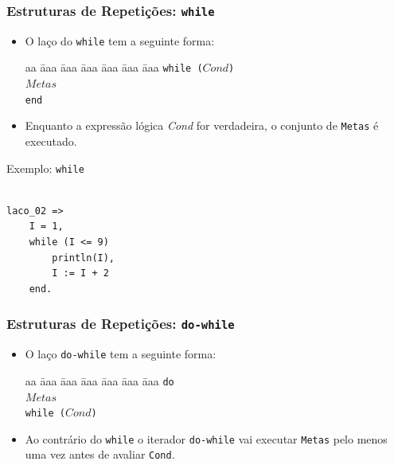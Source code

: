 \begin{frame}[fragile]
\frametitle{Estruturas de Repetições: \texttt{while}}


\begin{itemize}
        \item O laço do \texttt{while} tem a seguinte forma:
        
        \begin{tabbing}
            aa \= aaa \= aaa \= aaa \= aaa \= aaa \= aaa \kill
            \> \texttt{while ($Cond$)} \\
            \> \> $Metas$  \\
            \>  \texttt{end}
        \end{tabbing} 
        
        \item Enquanto a expressão lógica \emph{Cond} for verdadeira, o conjunto de \texttt{Metas} é executado.
        
\end{itemize}
\end{frame}    


\begin{frame}[fragile]

\begin{block}{Exemplo: \texttt{while} }
     
\begin{lstlisting}[frame=single]
  
laco_02 =>  
    I = 1,  
    while (I <= 9)  
        println(I),  
        I := I + 2  
    end.  
\end{lstlisting}
        
\end{block}
\end{frame}    

\begin{frame}[fragile]
\frametitle{Estruturas de Repetições: \texttt{do-while}}

    \begin{itemize}
        
        \item O laço \texttt{do-while} tem a seguinte forma:
        
        \begin{tabbing}
            aa \= aaa \= aaa \= aaa \= aaa \= aaa \= aaa \kill
            \> \texttt{do} \\
            \> \> $Metas$  \\
            \>  \texttt{while ($Cond$)}
        \end{tabbing} 
        
        \item Ao contrário do  \texttt{while} o iterador \texttt{do-while}
        vai executar \texttt{Metas} pelo menos uma vez antes de avaliar \texttt{Cond}.
        
    \end{itemize}
    
\end{frame}


